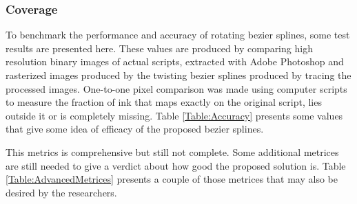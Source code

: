 \subsubsection{Coverage}
To benchmark the performance and accuracy  of rotating bezier splines, some test results are presented here. These values are produced by comparing high resolution binary images of actual scripts, extracted with Adobe Photoshop and rasterized images produced by the twisting bezier splines produced by tracing the processed images. One-to-one pixel comparison was made using computer scripts to measure the fraction of ink that maps exactly on the original script, lies outside it or is completely missing. Table \ref{Table:Accuracy} presents some values that give some idea of efficacy of the proposed bezier splines.
\begin{table}[ht]
\centering
{}
\caption{Benchmark of the mathematical accuracy of the twisting bezier spline curves}
\label{Table:Accuracy}
\end{table}

This metrics is comprehensive but still not complete. Some additional metrices are still needed to give a verdict about how good the proposed solution is. Table \ref{Table:AdvancedMetrices} presents a couple of those metrices that may also be desired by the researchers.


